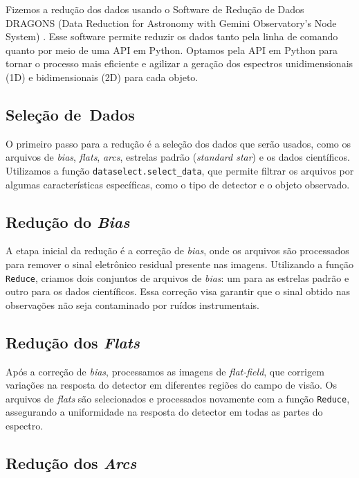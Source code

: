 Fizemos a redução dos dados usando o Software de Redução de Dados DRAGONS (Data Reduction for Astronomy with Gemini Observatory's Node System) \cite{dragons_python}. Esse software permite reduzir os dados tanto pela linha de comando quanto por meio de uma API em Python. Optamos pela API em Python para tornar o processo mais eficiente e agilizar a geração dos espectros unidimensionais (1D) e bidimensionais (2D) para cada objeto.

\subsection*{Seleção de~Dados}

O primeiro passo para a redução é a seleção dos dados que serão usados, como os arquivos de \textit{bias}, \textit{flats}, \textit{arcs}, estrelas padrão (\textit{standard star}) e os dados científicos. Utilizamos a função \verb|dataselect.select_data|, que permite filtrar os arquivos por algumas características específicas, como o tipo de detector e o objeto observado.

\subsection*{Redução do \textit{Bias}}

A etapa inicial da redução é a correção de \textit{bias}, onde os arquivos são processados para remover o sinal eletrônico residual presente nas imagens. Utilizando a função \verb|Reduce|, criamos dois conjuntos de arquivos de \textit{bias}: um para as estrelas padrão e outro para os dados científicos. Essa correção visa garantir que o sinal obtido nas observações não seja contaminado por ruídos instrumentais.

\subsection*{Redução dos \textit{Flats}}

Após a correção de \textit{bias}, processamos as imagens de \textit{flat-field}, que corrigem variações na resposta do detector em diferentes regiões do campo de visão. Os arquivos de \textit{flats} são selecionados e processados novamente com a função \verb|Reduce|, assegurando a uniformidade na resposta do detector em todas as partes do espectro.

\subsection*{Redução dos \textit{Arcs}}

